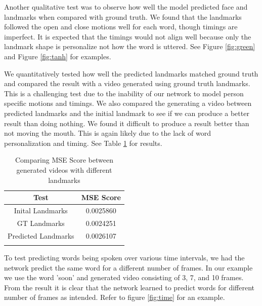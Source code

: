 \documentclass[10pt,twocolumn,letterpaper]{article}
\begin{document}
 Another qualitative test was to observe how well the model predicted face and landmarks when compared with ground truth. We found that the landmarks followed the open and close motions well for each word, though timings are imperfect. It is expected that the timings would not align well because only the landmark shape is personalize not how the word is uttered. See Figure \ref{fig:green} and Figure \ref{fig:tanh} for examples.
 
 We quantitatively tested how well the predicted landmarks matched ground truth and compared the result with a video generated using ground truth landmarks. This is a challenging test due to the inability of our network to model person specific motions and timings. We also compared the generating a video between predicted landmarks and the initial landmark to see if we can produce a better result than doing nothing. We found it difficult to produce a result better than not moving the mouth. This is again likely due to the lack of word personalization and timing. See Table \ref{table:mse_compare} for results.
 
 \begin{table}
 	\begin{center}
 	\begin{tabular}{ c|c}
 		\hline
 		Test & MSE Score \\ 
 		\hline
 		Inital Landmarks & 0.0025860 \\  
 		GT Landmarks & 0.0024251 \\  
 		Predicted Landmarks & 0.0026107 \\
 		 & 
 	\end{tabular}
 
 	\caption{Comparing MSE Score between generated videos with different landmarks}
	\label{table:mse_compare}
	\end{center}
 \end{table}

 To test predicting words being spoken over various time intervals, we had the network predict the same word for a different number of frames. In our example we use the word 'soon' and generated video consisting of 3, 7, and 10 frames. From the result it is clear that the network learned to predict words for different number of frames as intended. Refer to figure \ref{fig:time} for an example.
 
\end{document}
